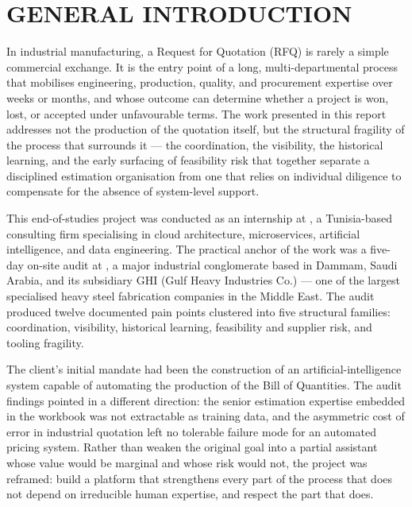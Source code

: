 \chapter*{GENERAL INTRODUCTION}
\adjustmtc
\thispagestyle{MyStyle}

In industrial manufacturing, a Request for Quotation (RFQ) is rarely a simple commercial exchange. It is the entry point of a long, multi-departmental process that mobilises engineering, production, quality, and procurement expertise over weeks or months, and whose outcome can determine whether a project is won, lost, or accepted under unfavourable terms. The work presented in this report addresses not the production of the quotation itself, but the structural fragility of the process that surrounds it --- the coordination, the visibility, the historical learning, and the early surfacing of feasibility risk that together separate a disciplined estimation organisation from one that relies on individual diligence to compensate for the absence of system-level support.

This end-of-studies project was conducted as an internship at \hostCompany, a Tunisia-based consulting firm specialising in cloud architecture, microservices, artificial intelligence, and data engineering. The practical anchor of the work was a five-day on-site audit at \clientCompany, a major industrial conglomerate based in Dammam, Saudi Arabia, and its subsidiary GHI (Gulf Heavy Industries Co.) --- one of the largest specialised heavy steel fabrication companies in the Middle East. The audit produced twelve documented pain points clustered into five structural families: coordination, visibility, historical learning, feasibility and supplier risk, and tooling fragility.

The client's initial mandate had been the construction of an artificial-intelligence system capable of automating the production of the Bill of Quantities. The audit findings pointed in a different direction: the senior estimation expertise embedded in the workbook was not extractable as training data, and the asymmetric cost of error in industrial quotation left no tolerable failure mode for an automated pricing system. Rather than weaken the original goal into a partial assistant whose value would be marginal and whose risk would not, the project was reframed: build a platform that strengthens every part of the process that does not depend on irreducible human expertise, and respect the part that does.

